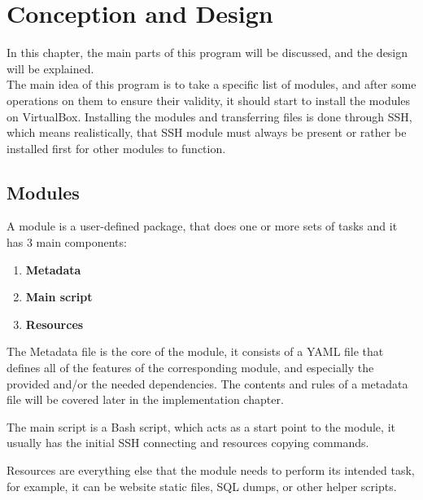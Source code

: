 \chapter{Conception and Design}
In this chapter, the main parts of this program will be discussed, and the design will be explained.\\
The main idea of this program is to take a specific list of modules, and after some operations on them to ensure their validity, it should start to install the modules on VirtualBox\cite{virtualbox}.
Installing the modules and transferring files is done through SSH, which means realistically, that SSH module must always be present or rather be installed first for other modules to function.

\section{Modules}
A module is a user-defined package, that does one or more sets of tasks and it has 3 main components:
\begin{enumerate}
    \item \textbf{Metadata}
    \item \textbf{Main script}
    \item \textbf{Resources}
\end{enumerate}
The Metadata file is the core of the module, it consists of a YAML file that defines all of the features of the corresponding module, and especially the provided and/or the needed dependencies.
The contents and rules of a metadata file will be covered later in the implementation chapter.

The main script is a Bash script, which acts as a start point to the module, it usually has the initial SSH connecting and resources copying commands.

Resources are everything else that the module needs to perform its intended task, for example, it can be website static files, SQL dumps, or other helper scripts.
\\

